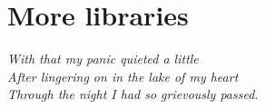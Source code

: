 \documentclass[a4paper]{report}
\begin{document}
\newpage

\addtolength{\hoffset}{-1cm}



%

%

%

\newpage
\chapter{More libraries}
\begin{flushright}
\textit{
					With that my panic quieted a little \\
          After lingering on in the lake of my heart \\
          Through the night I had so grievously passed. \\ 
       }
\end{flushright}
\addtolength{\hoffset}{1cm}

\newpage

\addtolength{\hoffset}{-1cm}


\end{document}
